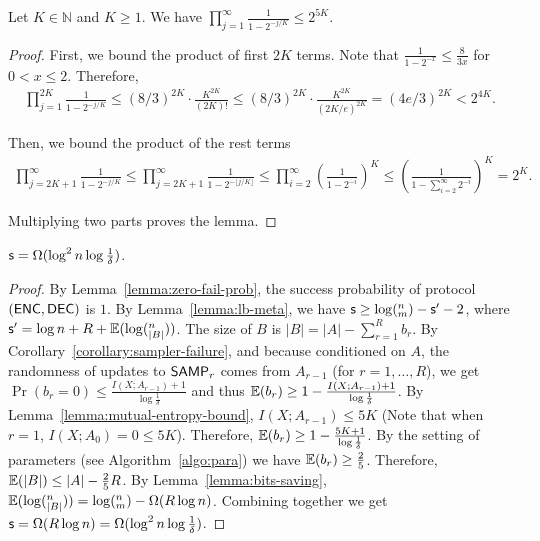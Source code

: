 \begin{lemma}\label{lemma:Pochhammer}
  Let $K\in \mathbb{N}$ and $K\ge 1$. We have $\prod_{j=1}^{\infty} \frac{1}{1-2^{-j/K}}\le 2^{5K}$.
\end{lemma}

\begin{proof}
  First, we bound the product of first $2K$ terms. Note that $\frac{1}{1-2^{-x}}\le \frac{8}{3x}$ for $0<x\le 2$. Therefore, 
  \begin{align}
    \prod_{j=1}^{2K}\frac{1}{1-2^{-j/K}}
    \le (8/3)^{2K}\cdot \frac{K^{2K}}{(2K)!}
    \le (8/3)^{2K}\cdot \frac{K^{2K}}{(2K/e)^{2K}}
    = (4e/3)^{2K}
    < 2^{4K}. 
  \end{align}
  
  Then, we bound the product of the rest terms
  \begin{align}
    \prod_{j=2K+1}^{\infty}\frac{1}{1-2^{-j/K}} 
    \le \prod_{j=2K+1}^{\infty}\frac{1}{1-2^{-\lfloor j/K \rfloor}} 
    \le \prod_{i=2}^{\infty}\left( \frac{1}{1-2^{-i}}\right)^K 
    \le \left( \frac{1}{1-\sum_{i=2}^{\infty}2^{-i}}\right)^K
    = 2^K.
  \end{align}
  
  Multiplying two parts proves the lemma.
\end{proof}

\begin{theorem}
  $\textsf{s} = \Omega(\log^2 n\log{\frac{1}{\delta}})$.
\end{theorem}

\begin{proof}
  By Lemma~\ref{lemma:zero-fail-prob}, the success probability of protocol $(\textsf{ENC},\textsf{DEC})$ is $1$. 
  By Lemma~\ref{lemma:lb-meta}, we have $\textsf{s}\ge \log (^n_m) - \textsf{s}' -2$, where $\textsf{s}'=\log n + R+ \operatorname*{\mathbb{E}}(\log (^n_{|B|}))$. 
  The size of $B$ is $|B|=|A|-\sum_{r=1}^{R}{b_r}$.
  By Corollary~\ref{corollary:sampler-failure}, and because conditioned on $A$, the randomness of updates to $\textsf{SAMP}_r$ comes from $A_{r-1}$ (for $r=1, \ldots, R$), we get $\Pr(b_r=0)\le \frac{I(X;A_{r-1})+1}{\log\frac{1}{\delta}}$ and thus $\operatorname*{\mathbb{E}}(b_r)\ge 1-\frac{I(X;A_{r-1})+1}{\log\frac{1}{\delta}}$. 
  By Lemma~\ref{lemma:mutual-entropy-bound}, $I(X;A_{r-1})\le 5K$ (Note that when $r=1$, $I(X;A_0)=0\le 5K$). Therefore, $\operatorname*{\mathbb{E}}(b_r)\ge 1-\frac{5K+1}{\log\frac{1}{\delta}}$.
  By the setting of parameters (see Algorithm~\ref{algo:para}) we have $\operatorname*{\mathbb{E}}(b_r)\ge \frac{2}{5}$. Therefore, $\operatorname*{\mathbb{E}}(|B|)\le |A|-\frac{2}{5}R$. 
  By Lemma~\ref{lemma:bits-saving}, $\operatorname*{\mathbb{E}}(\log (^n_{|B|}))=\log (^n_m)-\Omega(R\log n)$. 
  Combining together we get $\textsf{s}=\Omega(R\log n)=\Omega(\log^2 n \log\frac{1}{\delta})$.
\end{proof}